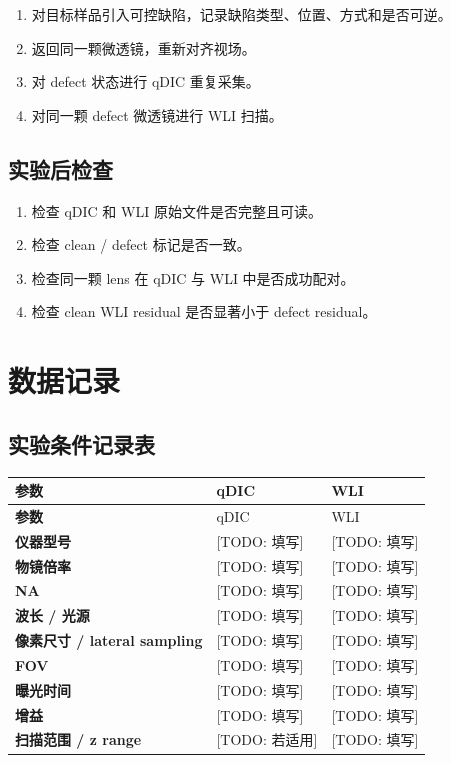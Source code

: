 \documentclass[UTF8,a4paper,11pt]{ctexart}
\newcommand{\TODO}[1]{\textcolor{red!70!black}{[TODO: #1]}}
\begin{document}
\begin{enumerate}
  \item 对目标样品引入可控缺陷，记录缺陷类型、位置、方式和是否可逆。
  \item 返回同一颗微透镜，重新对齐视场。
  \item 对 defect 状态进行 qDIC 重复采集。
  \item 对同一颗 defect 微透镜进行 WLI 扫描。
\end{enumerate}

\subsection{实验后检查}

\begin{enumerate}
  \item 检查 qDIC 和 WLI 原始文件是否完整且可读。
  \item 检查 clean / defect 标记是否一致。
  \item 检查同一颗 lens 在 qDIC 与 WLI 中是否成功配对。
  \item 检查 clean WLI residual 是否显著小于 defect residual。
\end{enumerate}

\section{数据记录}

\subsection{实验条件记录表}

\begin{longtable}{>{\bfseries}p{} p{} p{}}
\toprule
参数 & qDIC & WLI \\
\midrule
\endfirsthead
\toprule
参数 & qDIC & WLI \\
\midrule
\endhead
仪器型号 & \TODO{填写} & \TODO{填写} \\
物镜倍率 & \TODO{填写} & \TODO{填写} \\
NA & \TODO{填写} & \TODO{填写} \\
波长 / 光源 & \TODO{填写} & \TODO{填写} \\
像素尺寸 / lateral sampling & \TODO{填写} & \TODO{填写} \\
FOV & \TODO{填写} & \TODO{填写} \\
曝光时间 & \TODO{填写} & \TODO{填写} \\
增益 & \TODO{填写} & \TODO{填写} \\
扫描范围 / z range & \TODO{若适用} & \TODO{填写} \\
\bottomrule
\end{longtable}
\end{document}
